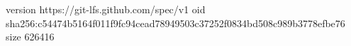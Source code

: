 version https://git-lfs.github.com/spec/v1
oid sha256:c54474b5164f011f9fc94cead78949503c37252f0834bd508c989b3778efbe76
size 626416
